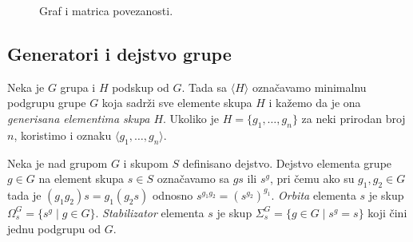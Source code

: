 \documentclass[12pt,oneside]{memoir}
\theoremstyle{definition}
\begin{document}
   \begin{figure}[htp]
	   \centering
	   \hspace{20pt}
	   \caption{Graf i matrica povezanosti.}
	   \label{img:matrix}
   \end{figure}


   \subsection{Generatori i dejstvo grupe}

   Neka je $G$ grupa i $H$ podskup od $G$. Tada sa $\langle H \rangle$
   označavamo minimalnu podgrupu grupe $G$ koja sadrži sve elemente skupa $H$ i
   kažemo da je ona \emph{generisana elementima skupa $H$}. Ukoliko je $H =
   \{g_1, \dots, g_n\}$ za neki prirodan broj $n$, koristimo i oznaku $\langle
   g_1, \dots, g_n \rangle$.

   Neka je nad grupom $G$ i skupom $S$ definisano dejstvo. Dejstvo elementa
   grupe $g \in G$ na element skupa $s \in S$ označavamo sa $gs$ ili $s^g$, pri
   čemu ako su $g_1, g_2 \in G$ tada je $(g_1g_2)s = g_1(g_2s)$ odnosno
   $s^{g_1g_2} = (s^{g_2})^{g_1}$.  \emph{Orbita} elementa $s$ je skup
   $\Omega_s^G = \{s^g \mid g \in G\}$.  \emph{Stabilizator} elementa $s$ je
   skup $\Sigma_s^G = \{g \in G \mid s^g=s\}$ koji čini jednu podgrupu od $G$.
\end{document}
